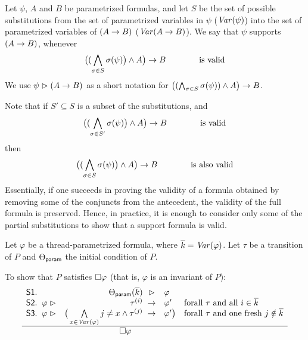 \begin{defn}[Support]
  Let $\psi$, $A$ and $B$ be parametrized formulas, and let $S$ be the
  set of possible substitutions from the set of parametrized variables in $\psi$ ($\mathit{Var}(\psi)$) into the set of parametrized variables of $(A\mathrel{\rightarrow} B)$ ($\mathit{Var}(A\mathrel{\rightarrow} B)$).
%
  We say that $\psi$ supports $(A\mathrel{\rightarrow} B)$, whenever
%
  \[ \big( (\bigwedge_{\sigma\in S} \sigma(\psi)\big) \wedge A\big) \mathrel{\rightarrow} B \hspace{4em} \text{is valid} \]
%
  We use $\psi\mathrel{\rhd}(A\mathrel{\rightarrow} B)$ as a short notation for
  $\big((\bigwedge_{\sigma\in S} \sigma(\psi)) \wedge A\big) \mathrel{\rightarrow} B$.  
\end{defn}

Note that if $S'\subseteq S$ is a subset of the substitutions, and 
%
  \[ \big( (\bigwedge_{\sigma\in S'} \sigma(\psi)\big) \wedge A\big) \mathrel{\rightarrow} B \hspace{4em} \text{is valid} \]
%
then
%
  \[ \big( (\bigwedge_{\sigma\in S} \sigma(\psi)\big) \wedge A\big) \mathrel{\rightarrow} B \hspace{4em} \text{is also valid} \]
%
  Essentially, if one succeeds in proving the validity of a formula obtained by removing some of the conjuncts from the antecedent, the validity of the full formula is preserved.
%
  Hence, in practice, it is enough to consider only some of the partial substitutions to show that a support formula is valid.


\begin{itheorem}
	Let $\varphi$ be a thread-parametrized formula, where $\overline{k}=\mathit{Var}(\varphi)$. 
	Let $\tau$ be a transition of $P$ and $\Theta_{\textsf{param}}$ the initial condition of $P$.

	To show that $P$ satisfies $\square\varphi$ (that is, $\varphi$ is an invariant of $P$):
	\hspace{-1em}
	\[ 
		\begin{array}{r@{\;\;}lr@{\;}@{\;}cl@{\hspace{1em}}l}
			\Premise{S1}. & & \ThetaParam(\overline{k}) &\supports & \varphi & \\

			\Premise{S2}. & \varphi \supports & \tau^{(i)} &\Into& \varphi'  & \text{forall $\tau$ and all $i\in \overline{k}$}\\
			\Premise{S3}. & \varphi\supports & \big(\bigwedge\limits_{x\in\Var(\varphi)} j\neq x \andcond \tau^{(j)} &\Into& \varphi' \big)& \text{forall $\tau$ and one fresh $j\notin\overline{k}$}\\ \hline
			& \multicolumn{4}{c}{\hspace{3em} \Always \varphi} &
		\end{array}
	\]
\label{thm:biggest}
\end{itheorem}



